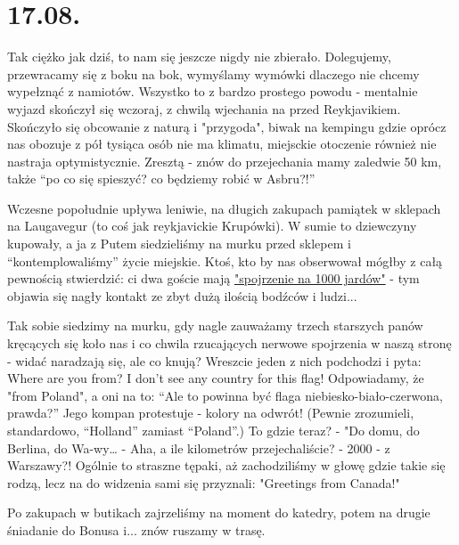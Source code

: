 \chapter{17.08.}

Tak ciężko jak dziś, to nam się jeszcze nigdy nie zbierało. Dolegujemy, przewracamy się z boku na bok, wymyślamy wymówki dlaczego nie chcemy wypełznąć z namiotów. Wszystko to z bardzo prostego powodu - mentalnie wyjazd skończył się wczoraj, z chwilą wjechania na  przed Reykjavikiem. Skończyło się obcowanie z naturą i "przygoda", biwak na kempingu gdzie oprócz nas obozuje z pół tysiąca osób nie ma klimatu, miejsckie otoczenie również nie nastraja optymistycznie. Zresztą - znów do przejechania mamy zaledwie 50 km, także “po co się spieszyć? co będziemy robić w Asbru?!”

Wczesne popołudnie upływa leniwie, na długich zakupach pamiątek w sklepach na Laugavegur (to coś jak reykjavickie Krupówki). W sumie to dziewczyny kupowały, a ja z Putem siedzieliśmy na murku przed sklepem i “kontemplowaliśmy” życie miejskie. Ktoś, kto by nas obserwował mógłby z całą pewnością stwierdzić: ci dwa goście mają \href{http://en.wikipedia.org/wiki/Thousand-yard_stare}{"spojrzenie na 1000 jardów"} - tym objawia się nagły kontakt ze zbyt dużą ilością bodźców i ludzi...


Tak sobie siedzimy na murku, gdy nagle zauważamy trzech starszych panów kręcących się koło nas i co chwila rzucających nerwowe spojrzenia w naszą stronę - widać naradzają się, ale co knują? Wreszcie jeden z nich podchodzi i pyta: Where are you from? I don’t see any country for this flag! Odpowiadamy, że "from Poland", a oni na to: “Ale to powinna być flaga niebiesko-biało-czerwona, prawda?” Jego kompan protestuje - kolory na odwrót! (Pewnie zrozumieli, standardowo, “Holland” zamiast “Poland”.) To gdzie teraz? - "Do domu, do Berlina, do Wa-wy… - Aha, a ile kilometrów przejechaliście? - 2000 - z Warszawy?! Ogólnie to straszne tępaki, aż zachodziliśmy w głowę gdzie takie się rodzą, lecz na do widzenia sami się przyznali: "Greetings from Canada!"

Po zakupach w butikach zajrzeliśmy na moment do katedry, potem na drugie śniadanie do Bonusa i... znów ruszamy w trasę.

